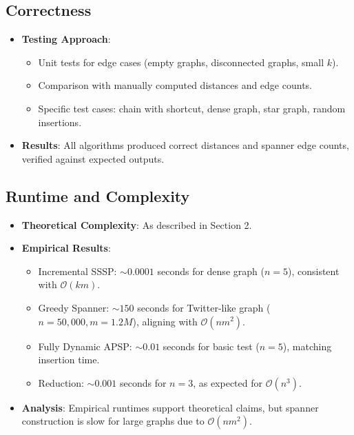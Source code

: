 \documentclass[11pt]{article}
\begin{document}
\subsection{Correctness}
\begin{itemize}
    \item \textbf{Testing Approach}:
    \begin{itemize}
        \item Unit tests for edge cases (empty graphs, disconnected graphs, small $k$).
        \item Comparison with manually computed distances and edge counts.
        \item Specific test cases: chain with shortcut, dense graph, star graph, random insertions.
    \end{itemize}
    \item \textbf{Results}: All algorithms produced correct distances and spanner edge counts, verified against expected outputs.
\end{itemize}

\subsection{Runtime and Complexity}
\begin{itemize}
    \item \textbf{Theoretical Complexity}: As described in Section 2.
    \item \textbf{Empirical Results}:
    \begin{itemize}
        \item Incremental SSSP: $\sim 0.0001$ seconds for dense graph ($n=5$), consistent with $\mathcal{O}(km)$.
        \item Greedy Spanner: $\sim 150$ seconds for Twitter-like graph ($n=50,000, m=1.2M$), aligning with $\mathcal{O}(nm^2)$.
        \item Fully Dynamic APSP: $\sim 0.01$ seconds for basic test ($n=5$), matching insertion time.
        \item Reduction: $\sim 0.001$ seconds for $n=3$, as expected for $\mathcal{O}(n^3)$.
    \end{itemize}
    \item \textbf{Analysis}: Empirical runtimes support theoretical claims, but spanner construction is slow for large graphs due to $\mathcal{O}(nm^2)$.
\end{itemize}
\end{document}
